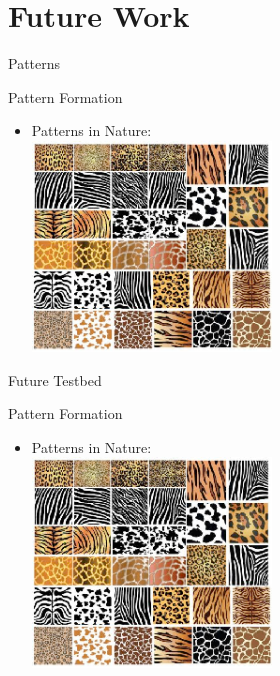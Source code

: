 \documentclass[t,10pt,fleqn]{beamer}
\begin{document}
\section{Future Work}
\begin{frame}{Patterns}
\vspace{-.3cm}
\begin{block}{Pattern Formation}
  \begin{itemize}
    \pause
    \item Patterns in Nature:
    \pause
    \\
    \includegraphics[width=0.5\textwidth]{creature_patterns2.png}
  \end{itemize}
\end{block}
\pause
\end{frame}

\begin{frame}{Future Testbed}
\vspace{-.3cm}
\begin{block}{Pattern Formation}
  \begin{itemize}
    \pause
    \item Patterns in Nature:
    \pause
    \\
    \includegraphics[width=0.5\textwidth]{creature_patterns2.png}
  \end{itemize}
\end{block}
\pause
\end{frame}
\end{document}
